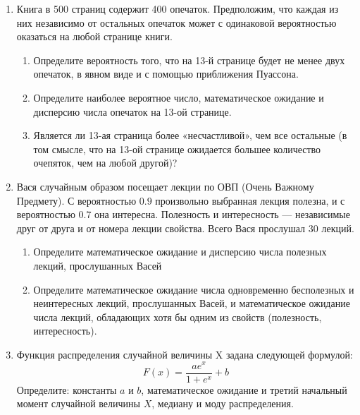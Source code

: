 \begin{enumerate}
\item Книга в 500 страниц содержит 400 опечаток. Предположим, что каждая из них
независимо от остальных опечаток может с одинаковой вероятностью оказаться на любой
странице книги.
\begin{enumerate}
\item Определите вероятность того, что на 13-й странице будет не менее двух опечаток,
в явном виде и с помощью приближения Пуассона.
\item Определите наиболее вероятное число, математическое ожидание и дисперсию
числа опечаток на 13-ой странице.
\item Является ли 13-ая страница более «несчастливой», чем все остальные (в том
смысле, что на 13-ой странице ожидается большее количество очепяток, чем на любой другой)?
\end{enumerate}

\item Вася случайным образом посещает лекции по ОВП (Очень Важному Предмету).
С вероятностью $0.9$ произвольно выбранная лекция полезна, и с вероятностью $0.7$
она интересна. Полезность и интересность — независимые друг от друга и от номера
лекции свойства. Всего Вася прослушал 30 лекций.
\begin{enumerate}
\item Определите математическое ожидание и дисперсию числа полезных лекций,
прослушанных Васей
\item Определите математическое ожидание числа одновременно бесполезных и
неинтересных лекций, прослушанных Васей, и математическое ожидание числа лекций,
обладающих хотя бы одним из свойств (полезность, интересность).
\end{enumerate}
\item Функция распределения случайной величины X задана следующей формулой:
 \[
 F(x)=\frac{ae^x}{1+e^x}+b
 \]
Определите: константы $a$ и $b$, математическое ожидание и третий начальный
момент случайной величины $X$, медиану и моду распределения.


\end{enumerate}

